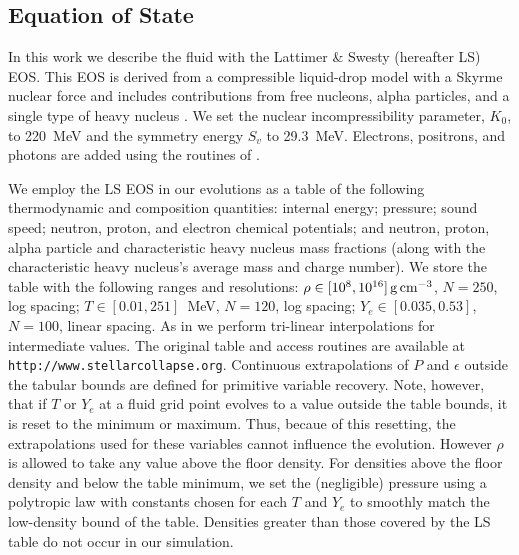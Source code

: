 \subsection{Equation of State}
\label{sec:EOS}

In this work we describe the fluid with the Lattimer \& Swesty (hereafter LS) EOS.
This EOS is derived from a compressible
liquid-drop model with a Skyrme nuclear force and includes contributions
from free nucleons, alpha particles, and a single type of heavy nucleus \citep{latt1991-nuc_eos}.
We set the nuclear incompressibility parameter, $K_0$, to 220~MeV and the
symmetry energy $S_v$ to 29.3~MeV.
Electrons, positrons, and photons are
added using the routines of \cite{timm1999-nuc_eos}.


We employ the LS EOS in our evolutions as a table of the following thermodynamic
and composition quantities: internal energy; pressure; sound speed;
neutron, proton, and electron chemical potentials;
and neutron, proton, alpha particle and characteristic heavy nucleus mass fractions
(along with the characteristic heavy nucleus's average mass and charge number).
We store the table with the following ranges and resolutions:
$\rho \in [10^{8},10^{16}]\rm\,g\,cm^{-3}$,
	$N=250$, log spacing;
$T \in [0.01,251]$~MeV,
	$N=120$, log spacing;
$Y_e \in [0.035,0.53]$,
	$N=100$, linear spacing.
As in \cite{ocon2010-gr1d} we perform tri-linear interpolations
for intermediate values. The original table and access routines
are available at \nolinkurl{http://www.stellarcollapse.org}.
Continuous extrapolations of $P$ and $\epsilon$ outside the tabular bounds
are defined for primitive variable recovery. Note, however, that if $T$ or $Y_e$ at a
fluid grid point evolves to a value outside the table bounds, it is reset to the minimum or maximum.
Thus, becaue of this resetting, the extrapolations used for these
variables cannot influence the evolution.
However $\rho$ is allowed to take any value above the floor density. 
For densities above the floor density and below the table minimum, we
set the (negligible) pressure using a polytropic law with constants chosen
for each $T$ and $Y_e$ to smoothly match the low-density bound of the table. 
Densities greater than those
covered by the LS table do not occur in our simulation.

